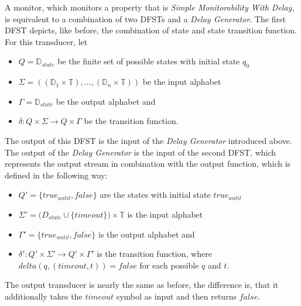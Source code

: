 	
		A monitor, which monitors a property that is \textit{Simple Monitorability With Delay}, is equivalent to a combination of two DFSTs and a \textit{Delay Generator}. The first DFST depicts, like before, the combination of state and state transition function. For this transducer, let
		\begin{itemize}
			\item
			$Q=\mathbb{D}_{state}$ be the finite set of possible states with initial state $q_0$
			\item
			$\Sigma=((\mathbb{D}_1\times \mathbb{T}),...,(\mathbb{D}_n\times \mathbb{T}))$ be the input alphabet
			\item
			$\Gamma = \mathbb D_{state}$ be the output alphabet and
			\item
			$\delta: Q\times \Sigma\rightarrow Q\times\Gamma$ be the transition function.
		\end{itemize}
		The output of this DFST is the input of the \textit{Delay Generator} introduced above. The output of the \textit{Delay Generator} is the input of the second DFST, which represents the output stream in combination with the output function, which is defined in the following way:
		\begin{itemize}
			\item
			$Q' = \{true_{until}, false\}$ are the states with initial state $true_{until}$
			\item
			$\Sigma'=\mathbb (D_{state}\cup\{timeout\})\times \mathbb{T}$ is the input alphabet
			\item
			$\Gamma' = \{true_{until}, false\}$ is the output alphabet and
			\item
			$\delta': Q'\times \Sigma'\rightarrow Q'\times\Gamma'$ is the transition function, where $delta(q, (timeout, t))=false$ for each possible $q$ and $t$.
		\end{itemize}
		The output transducer is nearly the same as before, the difference is, that it additionally takes the $timeout$ symbol as input and then returns $false$.

